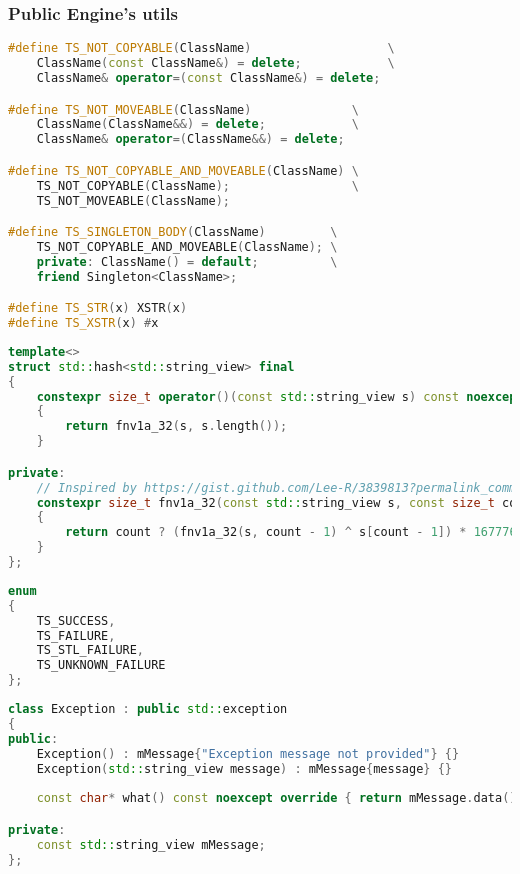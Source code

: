 \newpage

\subsubsection{Public Engine's utils}
\begin{lstlisting}[language=c++, caption=Macros of Public Engine's utils(./engine/include/tsengine/utils.hpp)]
#define TS_NOT_COPYABLE(ClassName)                   \
    ClassName(const ClassName&) = delete;            \
    ClassName& operator=(const ClassName&) = delete;

#define TS_NOT_MOVEABLE(ClassName)              \
    ClassName(ClassName&&) = delete;            \
    ClassName& operator=(ClassName&&) = delete;

#define TS_NOT_COPYABLE_AND_MOVEABLE(ClassName) \
    TS_NOT_COPYABLE(ClassName);                 \
    TS_NOT_MOVEABLE(ClassName);

#define TS_SINGLETON_BODY(ClassName)         \
    TS_NOT_COPYABLE_AND_MOVEABLE(ClassName); \
    private: ClassName() = default;          \
    friend Singleton<ClassName>;

#define TS_STR(x) XSTR(x)
#define TS_XSTR(x) #x
\end{lstlisting}
\begin{lstlisting}[language=c++, caption=std::string\_view hash of Public Engine's utils(./engine/include/tsengine/utils.hpp)]
template<>
struct std::hash<std::string_view> final
{
    constexpr size_t operator()(const std::string_view s) const noexcept
    {
        return fnv1a_32(s, s.length());
    }

private:
    // Inspired by https://gist.github.com/Lee-R/3839813?permalink_comment_id=4018536#gistcomment-4018536
    constexpr size_t fnv1a_32(const std::string_view s, const size_t count) const noexcept
    {
        return count ? (fnv1a_32(s, count - 1) ^ s[count - 1]) * 16777619u : 2166136261u;
    }
};
\end{lstlisting}
\begin{lstlisting}[language=c++, caption=Return Codes of Public Engine's utils(./engine/include/tsengine/utils.hpp)]
enum
{
    TS_SUCCESS,
    TS_FAILURE,
    TS_STL_FAILURE,
    TS_UNKNOWN_FAILURE
};
\end{lstlisting}

\begin{lstlisting}[language=c++, caption=Exception of Public Engine's utils(./engine/include/tsengine/utils.hpp)]
class Exception : public std::exception
{
public:
    Exception() : mMessage{"Exception message not provided"} {}
    Exception(std::string_view message) : mMessage{message} {}
    
    const char* what() const noexcept override { return mMessage.data(); }

private:
    const std::string_view mMessage;
};
\end{lstlisting}

